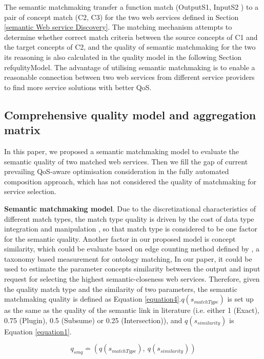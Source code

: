 \documentclass{llncs}
\begin{document}
The semantic matchmaking transfer a function match (OutputS1, InputS2 ) to a pair of concept match (C2, C3) for the two web services defined in Section \ref{semantic Web service Discovery}. The matching mechanism attempts to determine whether correct match criteria between the source concepts of C1 and the target concepts of C2, and the quality of semantic matchmaking for the two its reasoning is also calculated in the quality model in the following Section ref{qulityModel}. The advantage of utilising semantic matchmaking is to enable a reasonable connection between two web services from different service providers to find more service solutions with better QoS.

\subsection{Comprehensive quality model and aggregation matrix}\label{qulityModel}
In this paper, we proposed a semantic matchmaking model to evaluate the semantic quality of two matched web services. Then we fill the gap of current prevailing QoS-aware optimisation consideration in the fully automated composition approach, which has not considered the quality of matchmaking for service selection.

\textbf{Semantic matchmaking model}. Due to the discretizational characteristics of different match types, the match type quality is driven by the cost of  data type integration and manipulation \cite{lecue2009optimizing}, so that match type is considered to be one factor for the semantic quality. Another factor in our proposed model is concept similarity, which could be evaluate based on edge counting method defined by \cite{shet2012new}, a taxonomy based measurement for ontology matching, In our paper, it could be used to estimate the parameter concepts similarity between the output and input request for selecting the highest semantic-closeness web services. Therefore, given the quality match type and the similarity of two parameters, the semantic matchmaking quality is defined as Equation \ref{equation4}.$q(s_ {matchType})$ is set up as the same as the quality of the semantic link in literature \cite{lecue2009optimizing} (i.e. either 1 (Exact), 0.75 (Plugin), 0.5 (Subsume) or 0.25 (Intersection)), and $q(s_ {similarity})$ is Equation \ref{equation1}.

\begin{equation}
\label{equation4}
q_{smq} \stackrel{.}{=} (q(s_ {matchType}), \  q(s_ {similarity}))
\end{equation}
\end{document}
